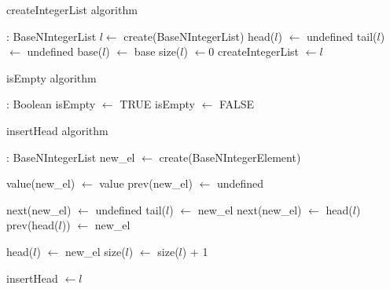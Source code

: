 \documentclass[book, nodocumentinfo]{upmethodology-document}
\begin{document}
\begin{algorithm}[H]
    \label{algo:basenintegerlist-create-integer-list}
    \caption{createIntegerList algorithm}

    \begin{algorithmic}
         : BaseNIntegerList
            \State \(l \leftarrow\) create(BaseNIntegerList)
            \State head(\(l\)) \(\leftarrow\) undefined
            \State tail(\(l\)) \(\leftarrow\) undefined
            \State base(\(l\)) \(\leftarrow\) base
            \State size(\(l\)) \(\leftarrow 0\)
            \State createIntegerList \(\leftarrow l\)
        \EndFunction
    \end{algorithmic}
\end{algorithm}

\begin{algorithm}[H]
    \label{algo:basenintegerlist-is-empty}
    \caption{isEmpty algorithm}

    \begin{algorithmic}
         : Boolean
                \State isEmpty \(\leftarrow\) TRUE
            \Else
                \State isEmpty \(\leftarrow\) FALSE
            \EndIf
        \EndFunction
    \end{algorithmic}
\end{algorithm}

\begin{algorithm}[H]
    \label{algo:basenintegerlist-insert-head}
    \caption{insertHead algorithm}

    \begin{algorithmic}
         : BaseNIntegerList
            \State new\_el \(\leftarrow\) create(BaseNIntegerElement)

            \State value(new\_el) \(\leftarrow\) value
            \State prev(new\_el) \(\leftarrow\) undefined

                \State next(new\_el) \(\leftarrow\) undefined
                \State tail(\(l\)) \(\leftarrow\) new\_el
            \Else
                \State next(new\_el) \(\leftarrow\) head(\(l\))
                \State prev(head(\(l\))) \(\leftarrow\) new\_el
            \EndIf

            \State head(\(l\)) \(\leftarrow\) new\_el
            \State size(\(l\)) \(\leftarrow\) size(\(l\)) + 1

            \State insertHead \(\leftarrow l\)
        \EndFunction
    \end{algorithmic}
\end{algorithm}
\end{document}
